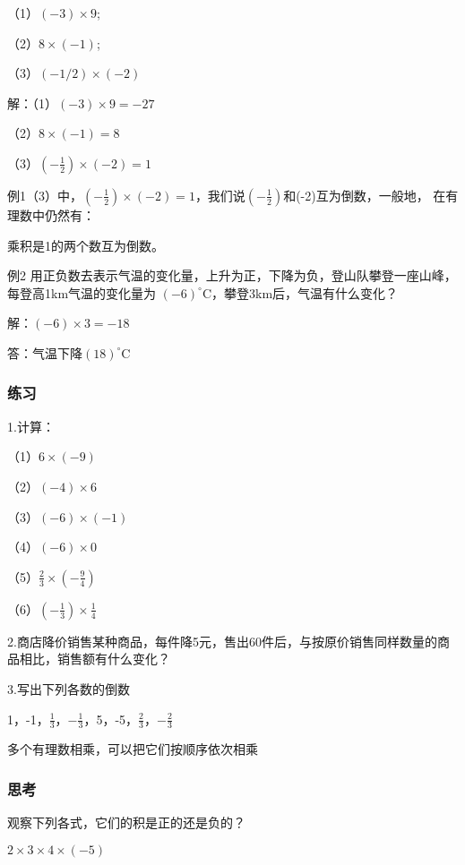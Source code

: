 \documentclass{article}
\begin{document}
\begin{article}
\begin{example}
（1）$(-3)\times9$;

（2）$8\times(-1)$;

（3）$(-1/2)\times(-2)$

解：（1）$(-3)\times9=-27$

（2）$8\times(-1)=8$

（3）$(-\frac{1}{2})\times(-2)=1$

例1（3）中，$(-\frac{1}{2})\times(-2)=1$，我们说$(-\frac{1}{2})$和(-2)互为倒数，一般地，
在有理数中仍然有：

乘积是1的两个数互为倒数。

例2 用正负数去表示气温的变化量，上升为正，下降为负，登山队攀登一座山峰，每登高1km气温的变化量为
$(-6)^\circ$C，攀登3km后，气温有什么变化？

解：$(-6)\times3=-18$

答：气温下降$(18)^\circ$C

\end{example}

\begin{exercise}

\subsubsection{练习}

1.计算：

（1）$6\times(-9)$

（2）$(-4)\times6$

（3）$(-6)\times(-1)$

（4）$(-6)\times0$

（5）$\frac{2}{3}\times(-\frac{9}{4})$

（6）$(-\frac{1}{3})\times\frac{1}{4}$

2.商店降价销售某种商品，每件降5元，售出60件后，与按原价销售同样数量的商品相比，销售额有什么变化？

3.写出下列各数的倒数

1，-1，$\frac{1}{3}$，$-\frac{1}{3}$，5，-5，$\frac{2}{3}$，$-\frac{2}{3}$

\end{exercise}

多个有理数相乘，可以把它们按顺序依次相乘

\subsubsection{思考}

观察下列各式，它们的积是正的还是负的？

$2\times3\times4\times(-5)$


\end{article}
\end{document}
